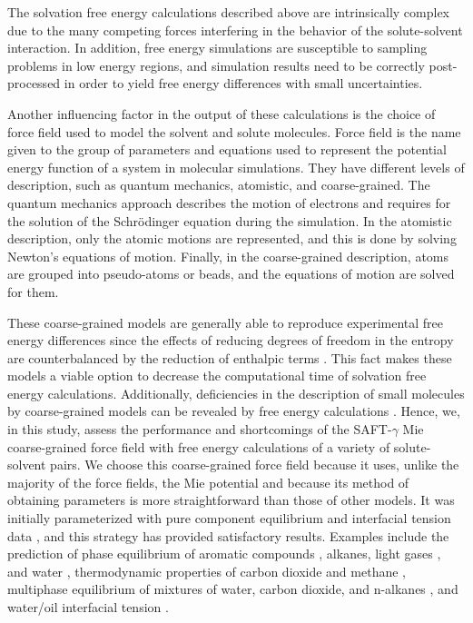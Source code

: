 The solvation free energy calculations described above are intrinsically complex due to the many competing forces interfering in the behavior of the solute-solvent interaction. In addition, free energy simulations are susceptible to sampling problems in low energy regions, and simulation results need to be correctly post-processed in order to yield free energy differences with small uncertainties. {Another influencing factor in the output of these calculations is the choice of force field used to model the solvent and solute molecules. Force field is the name given to the group of parameters and equations used to represent the potential energy function of a system in molecular simulations. They have different levels of description, such as quantum mechanics, atomistic, and coarse-grained. The quantum mechanics approach describes the motion of electrons and requires for the solution of the Schr\"{o}dinger equation during the simulation. In the atomistic description, only the atomic motions are represented,  and this is done by solving Newton's equations of motion. Finally, in the coarse-grained description, atoms are grouped into pseudo-atoms or beads, and the equations of motion are solved for them. 
	
These coarse-grained models are generally able to reproduce experimental free energy differences since the effects of reducing degrees of freedom in the entropy are counterbalanced by the reduction of enthalpic terms \cite{kmiecik2016}. This fact makes these models a viable option to decrease the computational time of solvation free energy calculations. Additionally, deficiencies in the description of small molecules by coarse-grained models can be revealed by free energy calculations \cite{mobley2007,shirts2013}. Hence, we, in this study, assess the performance and shortcomings of the SAFT-$\gamma$ Mie coarse-grained force field  \cite{avendano2011} with free energy calculations of a variety of solute-solvent pairs. We choose this coarse-grained force field because it uses, unlike the majority of the force fields, the Mie potential \cite{MIE} and because its method of obtaining parameters is more straightforward than those of other models. It was initially parameterized with pure component equilibrium and interfacial tension data \cite{avendano2011}, and this strategy has provided satisfactory results. Examples include the prediction of phase equilibrium of aromatic compounds \cite{muller2017}, alkanes, light gases \cite{herdes2015}, and water \cite{lobanova2015}, thermodynamic properties of carbon dioxide and methane \cite{cassiano1}, multiphase equilibrium of mixtures of water, carbon dioxide, and n-alkanes \cite{lobanova2016}, and water/oil interfacial tension \cite{herdes2017}.} 


